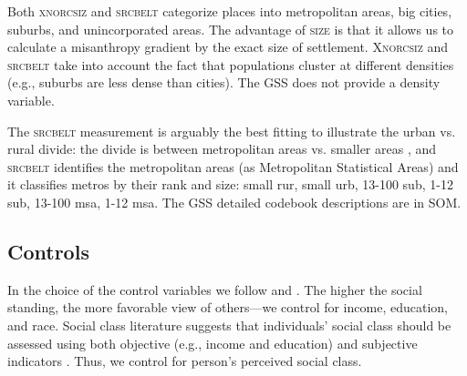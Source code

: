 \documentclass[11pt, letterpaper]{article}
\begin{document}
\begin{spacing}{1.4}
Both \textsc{xnorcsiz} and \textsc{srcbelt} categorize places into metropolitan areas, big cities, suburbs, and  unincorporated areas. The advantage of \textsc{size} is that it allows us to calculate a misanthropy 
 gradient by the exact size of settlement. \textsc{Xnorcsiz} and \textsc{srcbelt} take into account the fact that populations cluster at different densities (e.g., suburbs are less dense than cities). The GSS does not provide a density variable. 

The \textsc{srcbelt} measurement is arguably the best fitting to illustrate the
urban vs. rural divide: the divide is between metropolitan areas vs. smaller areas
\citep{hansonCityJournalautumn15}, and \textsc{srcbelt} identifies the
metropolitan areas (as Metropolitan Statistical Areas) and it classifies metros
by their rank and size: small rur, small urb, 13-100 sub, 1-12 sub, 13-100 msa, 1-12 msa. The GSS detailed codebook descriptions are in SOM. 
   

\subsection*{Controls}

In the choice of the control variables we follow \citet{welch07} and  \citet{smith97}.
The higher the social standing, the more favorable view of others---we
control for income, education, and race. Social class literature suggests that
individuals' social class should be assessed  using both objective (e.g.,
income and education) and subjective indicators \citep[e.g.,][]{kraus09}. %
Thus, we control for person's perceived social class. 


\end{spacing}
\end{document}
